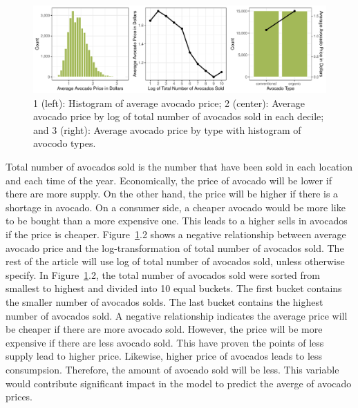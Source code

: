 \documentclass[11pt]{article}\usepackage[]{graphicx}\usepackage[]{color}
\makeatletter
\def\maxwidth{ %
  \ifdim\Gin@nat@width>\linewidth
    \linewidth
  \else
    \Gin@nat@width
  \fi
}
\makeatother
\begin{document}
\begin{figure}[h!] 
\begin{center}

\includegraphics[width=\maxwidth]{figure/unnamed-chunk-1-1} 

\caption{1 (left): Histogram of average avocado price; 2 (center): Average avocado price by log of total number of avocados sold in each decile; and 3 (right): Average avocado price by type with histogram of avocodo types.}
\label{explore1}
\end{center} 
\end{figure}

\noindent Total number of avocados sold is the number that have been sold in each location and each time of the year. Economically, the price of avocado will be lower if there are more supply. On the other hand, the price will be higher if there is a shortage in avocado. On a consumer side, a cheaper avocado would be more like to be bought than a more expensive one. This leads to a higher sells in avocados if the price is cheaper. Figure~\ref{explore1}.2 shows a negative relationship between average avocado price and the log-transformation of total number of avocados sold. The rest of the article will use log of total number of avocados sold, unless otherwise specify. In Figure~\ref{explore1}.2, the total number of avocados sold were sorted from smallest to highest and divided into 10 equal buckets. The first bucket contains the smaller number of avocados solds. The last bucket contains the highest number of avocados sold. A negative relationship indicates the average price will be cheaper if there are more avocado sold. However, the price will be more expensive if there are less avocado sold. This have proven the points of less supply lead to higher price. Likewise, higher price of avocados leads to less consumpsion. Therefore, the amount of avocado sold will be less. This variable would contribute significant impact in the model to predict the averge of avocado prices.  
\hfill \break
\end{document}
